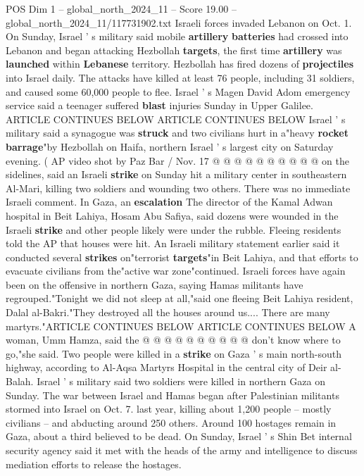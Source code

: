\begin{textsample}{POS Dim 1 – global\_north\_2024\_11 – Score 19.00 – global\_north\_2024\_11/117731902.txt}
Israeli forces invaded Lebanon on Oct. 1.
On Sunday, Israel ' s military said mobile \textbf{artillery} \textbf{batteries} had crossed into Lebanon and began attacking Hezbollah \textbf{targets}, the first time \textbf{artillery} was \textbf{launched} within \textbf{Lebanese} territory.
Hezbollah has fired dozens of \textbf{projectiles} into Israel daily.
The attacks have killed at least 76 people, including 31 soldiers, and caused some 60,000 people to flee.
Israel ' s Magen David Adom emergency service said a teenager suffered \textbf{blast} injuries Sunday in Upper Galilee.
ARTICLE CONTINUES BELOW ARTICLE CONTINUES BELOW Israel ' s military said a synagogue was \textbf{struck} and two civilians hurt in a"heavy \textbf{rocket} \textbf{barrage}"by Hezbollah on Haifa, northern Israel ' s largest city on Saturday evening. ( AP video shot by Paz Bar / Nov. 17 @ @ @ @ @ @ @ @ @ @ on the sidelines, said an Israeli \textbf{strike} on Sunday hit a military center in southeastern Al-Mari, killing two soldiers and wounding two others.
There was no immediate Israeli comment.
In Gaza, an \textbf{escalation} The director of the Kamal Adwan hospital in Beit Lahiya, Hosam Abu Safiya, said dozens were wounded in the Israeli \textbf{strike} and other people likely were under the rubble.
Fleeing residents told the AP that houses were hit.
An Israeli military statement earlier said it conducted several \textbf{strikes} on"terrorist \textbf{targets}"in Beit Lahiya, and that efforts to evacuate civilians from the"active war zone"continued.
Israeli forces have again been on the offensive in northern Gaza, saying Hamas militants have regrouped."Tonight we did not sleep at all,"said one fleeing Beit Lahiya resident, Dalal al-Bakri."They destroyed all the houses around us....
There are many martyrs."ARTICLE CONTINUES BELOW ARTICLE CONTINUES BELOW A woman, Umm Hamza, said the @ @ @ @ @ @ @ @ @ @ don't know where to go,"she said.
Two people were killed in a \textbf{strike} on Gaza ' s main north-south highway, according to Al-Aqsa Martyrs Hospital in the central city of Deir al-Balah.
Israel ' s military said two soldiers were killed in northern Gaza on Sunday.
The war between Israel and Hamas began after Palestinian militants stormed into Israel on Oct. 7. last year, killing about 1,200 people -- mostly civilians -- and abducting around 250 others.
Around 100 hostages remain in Gaza, about a third believed to be dead.
On Sunday, Israel ' s Shin Bet internal security agency said it met with the heads of the army and intelligence to discuss mediation efforts to release the hostages.

\end{textsample}
